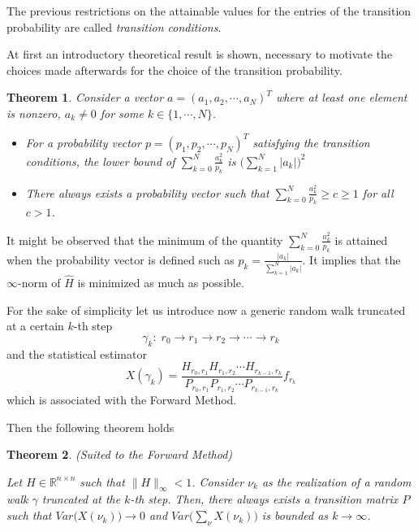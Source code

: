 \documentclass[a4paper,10pt]{article}
\newtheorem{thm}{Theorem}
\begin{document}
The previous restrictions on the attainable values for the entries of the 
transition probability are called \textit{transition conditions}.


At first an introductory theoretical result is shown, necessary to motivate the
choices made afterwards for the choice of the transition probability.

\begin{thm}
 Consider a vector $a=(a_1,a_2,\cdots,a_N)^T$ where at least one element is 
nonzero, $a_k\ne0$ for some $k\in\{1,\cdots,N\}$.
\begin{itemize}
 \item For a probability vector $p=(p_1,p_2,\cdots,p_N)^T$ satisfying the 
transition conditions, the lower bound of $\displaystyle 
\sum_{k=0}^N\frac{a_k^2}{p_k}$ is $\bigg(\sum_{k=1}^N \lvert a_k\rvert\bigg)^2$
\item There always exists a probability vector such that $\displaystyle 
\sum_{k=0}^N\frac{a_k^2}{p_k}\ge c\ge 1$ for all $c>1$.
\end{itemize}
\label{lemma}
\end{thm}

It might be observed that the minimum of the quantity $\displaystyle 
\sum_{k=0}^N\frac{a_k^2}{p_k}$ is attained when the probability vector is 
defined such as $\displaystyle p_k=\frac{\lvert a_k\rvert}{\sum_{k=1}^N \lvert 
a_k\rvert}$. It implies that the $\infty$-norm of $\hat{H}$ is minimized as 
much 
as possible. \newline

For the sake of simplicity let us introduce now a generic random walk
truncated at a certain $k$-th step
\[
 \gamma_k:\; r_0\rightarrow r_1 \rightarrow r_2 \rightarrow \cdots \rightarrow 
r_k
\]
and the statistical estimator
\[
 X(\gamma_k)=\frac{H_{r_0,r_1}H_{r_1,r_2}\cdots 
H_{r_{k-1},r_k}}{P_{r_0,r_1}P_{r_1,r_2}\cdots P_{r_{k-1},r_k}}f_{r_k}
\]
which is associated with the Forward Method.

Then the following theorem holds
\begin{thm}\textit{(Suited to the Forward Method)}

Let $H\in \mathbb{R}^{n\times n}$ such that $\lVert H\rVert_{\infty}<1$. 
Consider $\nu_k$ as the realization of a random walk $\gamma$ truncated at the 
$k$-th step. Then, 
there always exists a 
transition matrix $P$ such that 
$Var\Big(X(\nu_k)\Big)\rightarrow 0$ and 
$Var\Big(\sum_{\nu}X(\nu_k)\Big)$ is bounded as $k\rightarrow \infty$.
\label{for_thm}
\end{thm}
\end{document}
